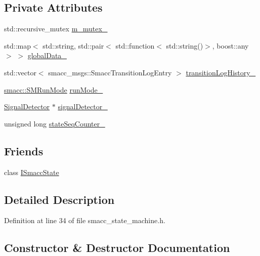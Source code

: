\subsection*{Private Attributes}
\begin{DoxyCompactItemize}
\item 
std\+::recursive\+\_\+mutex \hyperlink{classsmacc_1_1ISmaccStateMachine_aac785541646e5c517273bf31072505a1}{m\+\_\+mutex\+\_\+}
\item 
std\+::map$<$ std\+::string, std\+::pair$<$ std\+::function$<$ std\+::string()$>$, boost\+::any $>$ $>$ \hyperlink{classsmacc_1_1ISmaccStateMachine_ad2f9dae184ea942db632ac4532a10a91}{global\+Data\+\_\+}
\item 
std\+::vector$<$ smacc\+\_\+msgs\+::\+Smacc\+Transition\+Log\+Entry $>$ \hyperlink{classsmacc_1_1ISmaccStateMachine_af682d5fce5bb7c959e2b8814dae50023}{transition\+Log\+History\+\_\+}
\item 
\hyperlink{namespacesmacc_a3e4f79486ea6ea6342dd3c712d16a4f6}{smacc\+::\+S\+M\+Run\+Mode} \hyperlink{classsmacc_1_1ISmaccStateMachine_a9f8cfbf577f7ae7a48b7a328e2e6b589}{run\+Mode\+\_\+}
\item 
\hyperlink{classsmacc_1_1SignalDetector}{Signal\+Detector} $\ast$ \hyperlink{classsmacc_1_1ISmaccStateMachine_a3982eb671f5f001cb047d3a467789986}{signal\+Detector\+\_\+}
\item 
unsigned long \hyperlink{classsmacc_1_1ISmaccStateMachine_ab41ee07d20715142e2f7c92d551b2bd6}{state\+Seq\+Counter\+\_\+}
\end{DoxyCompactItemize}
\subsection*{Friends}
\begin{DoxyCompactItemize}
\item 
class \hyperlink{classsmacc_1_1ISmaccStateMachine_ab907e4cdbf326246355f56640780162e}{I\+Smacc\+State}
\end{DoxyCompactItemize}


\subsection{Detailed Description}


Definition at line 34 of file smacc\+\_\+state\+\_\+machine.\+h.



\subsection{Constructor \& Destructor Documentation}
